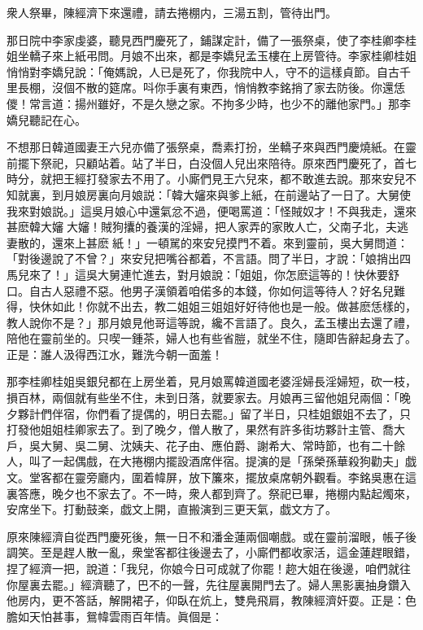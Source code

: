 衆人祭畢，陳經濟下來還禮，請去捲棚内，三湯五割，管待出門。

那日院中李家虔婆，聽見西門慶死了，鋪謀定計，備了一張祭桌，使了李桂卿李桂姐坐轎子來上紙弔問。月娘不出來，都是李嬌兒孟玉樓在上房管待。李家桂卿桂姐悄悄對李嬌兒說：「俺媽說，人已是死了，你我院中人，守不的這樣貞節。自古千里長棚，沒個不散的筵席。呌你手裏有東西，悄悄教李銘捎了家去防後。你還恁儍！常言道：揚州雖好，不是久戀之家。不拘多少時，也少不的離他家門。」那李嬌兒聽記在心。

不想那日韓道國妻王六兒亦備了張祭桌，喬素打扮，坐轎子來與西門慶燒紙。在靈前擺下祭祀，只顧站着。站了半日，白没個人兒出來陪待。原來西門慶死了，首七時分，就把王經打發家去不用了。小廝們見王六兒來，都不敢進去說。那來安兒不知就裏，到月娘房裏向月娘説：「韓大嬸來與爹上紙，在前邊站了一日了。大舅使我來對娘説。」這吳月娘心中還氣忿不過，便喝罵道：「怪賊奴才！不與我走，還來甚麽韓大嬸𣭈大嬸！賊狗攮的養漢的淫婦，把人家弄的家敗人亡，父南子北，夫逃妻散的，還來上甚麽𣭈紙！」一頓駡的來安兒摸門不着。來到靈前，吳大舅問道：「對後邊說了不曾？」來安兒把嘴谷都着，不言語。問了半日，才說：「娘捎出四馬兒來了！」這吳大舅連忙進去，對月娘說：「姐姐，你怎麽這等的！快休要舒口。自古人惡禮不惡。他男子漢領着咱偌多的本錢，你如何這等待人？好名兒難得，快休如此！你就不出去，教二姐姐三姐姐好好待他也是一般。做甚麽恁樣的，教人說你不是？」那月娘見他哥這等說，纔不言語了。良久，孟玉樓出去還了禮，陪他在靈前坐的。只喫一鍾茶，婦人也有些省䐩，就坐不住，隨即告辭起身去了。正是：誰人汲得西江水，難洗今朝一面羞！

那李桂卿桂姐吳銀兒都在上房坐着，見月娘罵韓道國老婆淫婦長淫婦短，砍一枝，損百林，兩個就有些坐不住，未到日落，就要家去。月娘再三留他姐兒兩個：「晚夕夥計們伴宿，你們看了提偶的，明日去罷。」留了半日，只桂姐銀姐不去了，只打發他姐姐桂卿家去了。到了晚夕，僧人散了，果然有許多街坊夥計主管、喬大戶，吳大舅、吳二舅、沈姨夫、花子由、應伯爵、謝希大、常時節，也有二十餘人，叫了一起偶戲，在大捲棚内擺設酒席伴宿。提演的是「孫榮孫華殺狗勸夫」戯文。堂客都在靈旁廳内，圍着幃屏，放下簾來，擺放桌席朝外觀看。李銘吳惠在這裏答應，晚夕也不家去了。不一時，衆人都到齊了。祭祀已畢，捲棚内點起燭來，安席坐下。打動鼓楽，戯文上開，直搬演到三更天氣，戯文方了。

原來陳經濟自從西門慶死後，無一日不和潘金蓮兩個嘲戲。或在靈前溜眼，帳子後調笑。至是趕人散一亂，衆堂客都往後邊去了，小廝們都收家活，這金蓮趕眼錯，捏了經濟一把，說道：「我兒，你娘今日可成就了你罷！趂大姐在後邊，咱們就往你屋裏去罷。」經濟聽了，巴不的一聲，先往屋裏開門去了。婦人黑影裏抽身鑽入他房内，更不答話，解開裙子，仰臥在炕上，雙鳧飛肩，教陳經濟奸耍。正是：色膽如天怕甚事，鴛幃雲雨百年情。眞個是：

